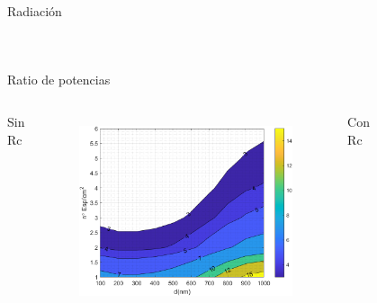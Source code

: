 \documentclass[spanish,a4paper]{beamer}%
\newcommand{\resRelPath}{\graphicspath{{./figuras/Resultados/RelacionCondRad/}}}
\begin{document}
\begin{frame}{Radiación}
\begin{columns}
\begin{figure}[h]
								\label{fig:SiCGevsSiGe_radInt}%
						\end{figure}
						\vfill
				\end{columns}		
		\end{frame}
		\begin{frame}{Ratio de potencias}
			\resRelPath
			\begin{columns}
						\begin{block}{\centering Sin Rc}
						\end{block}
					\vspace{10pt}
						\begin{figure}[h]%
								\centering
										\includegraphics[width=\columnwidth]{SiC_Ge}
								\label{fig:SiCSiO2Ge_rel}%
						\end{figure}
						\vfill
					\vspace{-12pt}
						\begin{block}{\centering Con Rc}
							\end{block}
					\vspace{10pt}
						\begin{figure}[h]%
								\centering

\end{figure}
\end{columns}
\end{frame}
\end{document}
